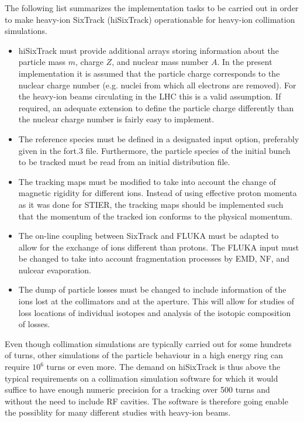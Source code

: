 The following list summarizes the implementation tasks to be carried out in order to make heavy-ion SixTrack (hiSixTrack) operationable for heavy-ion collimation simulations.
%
\begin{itemize}
        \item hiSixTrack must provide additional arrays storing information about the particle mass $m$, charge $Z$, and nuclear mass number $A$. In the present implementation it is assumed that the particle charge corresponds to the nuclear charge number (e.g. nuclei from which all electrons are removed). For the heavy-ion beams circulating in the LHC this is a valid assumption. If required, an adequate extension to define the particle charge differently than the nuclear charge number is fairly easy to implement. 
	\item The reference species must be defined in a designated input option, preferably given in the fort.3 file. Furthermore, the particle species of the initial bunch to be tracked must be read from an initial distribution file.
	\item The tracking maps must be modified to take into account the change of magnetic rigidity for different ions. Instead of using effective proton momenta as it was done for STIER, the tracking maps should be implemented such that the momentum of the tracked ion conforms to the physical momentum. 
	\item The on-line coupling between SixTrack and FLUKA must be adapted to allow for the exchange of ions different than protons. The FLUKA input must be changed to take into account fragmentation processes by EMD, NF, and nulcear evaporation. 
	\item The dump of particle losses must be changed to include information of the ions lost at the collimators and at the aperture. This will allow for studies of loss locations of individual isotopes and analysis of the isotopic composition of losses. 

\end{itemize}

Even though collimation simulations are typically carried out for some hundrets of turns, other simulations of the particle behaviour in a high energy ring can require $10^6$ turns or even more. The demand on hiSixTrack is thus above the typical requirements on a collimation simulation software for which it would suffice to have enough numeric precision for a tracking over 500 turns and without the need to include RF cavities. The software is therefore going enable the possiblity for many different studies with heavy-ion beams.

